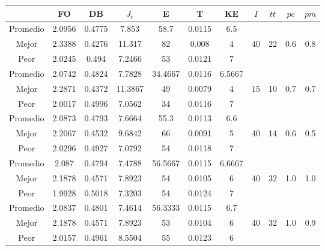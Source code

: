 \begin{table}[h!]
    \footnotesize
    \begin{center}
        \begin{tabular}{|c|c|c|c|c|c|c|c|c|c|c|}
        \hline
             & {\bf FO} & {\bf DB} & $J_e$ & {\bf E} & {\bf T} & {\bf KE} & $I$ & $tt$ & $pc$ & $pm$ \\
        \hline
        \hline
            Promedio  & 2.0956 & 0.4775 & 7.853 & 58.7 & 0.0115 & 6.5 &  &  &  & \\
            \cline{1-7}
            Mejor & 2.3388 & 0.4276  & 11.317 & 82 & 0.008 & 4 & 40 & 22 & 0.6 & 0.8\\
            \cline{1-7}
            Peor & 2.0245 & 0.494  & 7.2466 & 53 & 0.0121 & 7 &  &  &  & \\
        \hline
        \hline
            Promedio  & 2.0742 & 0.4824 & 7.7828 & 34.4667 & 0.0116 & 6.5667 &  &  &  & \\
            \cline{1-7}
            Mejor & 2.2871 & 0.4372  & 11.3867 & 49 & 0.0079 & 4 & 15 & 10 & 0.7 & 0.7\\
            \cline{1-7}
            Peor & 2.0017 & 0.4996  & 7.0562 & 34 & 0.0116 & 7 &  &  &  & \\
        \hline
        \hline
            Promedio  & 2.0873 & 0.4793 & 7.6664 & 55.3 & 0.0113 & 6.6 &  &  &  & \\
            \cline{1-7}
            Mejor & 2.2067 & 0.4532  & 9.6842 & 66 & 0.0091 & 5 & 40 & 14 & 0.6 & 0.5\\
            \cline{1-7}
            Peor & 2.0296 & 0.4927  & 7.0792 & 54 & 0.0118 & 7 &  &  &  & \\
        \hline
        \hline
            Promedio  & 2.087 & 0.4794 & 7.4788 & 56.5667 & 0.0115 & 6.6667 &  &  &  & \\
            \cline{1-7}
            Mejor & 2.1878 & 0.4571  & 7.8923 & 54 & 0.0105 & 6 & 40 & 32 & 1.0 & 1.0\\
            \cline{1-7}
            Peor & 1.9928 & 0.5018  & 7.3203 & 54 & 0.0124 & 7 &  &  &  & \\
        \hline
        \hline
            Promedio  & 2.0837 & 0.4801 & 7.4614 & 56.3333 & 0.0115 & 6.7 &  &  &  & \\
            \cline{1-7}
            Mejor & 2.1878 & 0.4571  & 7.8923 & 53 & 0.0104 & 6 & 40 & 32 & 1.0 & 0.9\\
            \cline{1-7}
            Peor & 2.0157 & 0.4961  & 8.5504 & 55 & 0.0123 & 6 &  &  &  & \\

\end{tabular}
\end{center}
\end{table}
